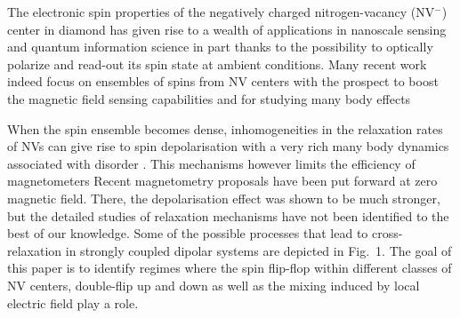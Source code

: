 \documentclass[preprintnumbers,amsmath,amssymb,superscriptaddress,twocolumn,showpacs]{revtex4-2}
\begin{document}
%

The electronic spin properties of the negatively charged nitrogen-vacancy (NV$^-$) center in diamond has given rise to a wealth of applications in nanoscale sensing and quantum information science in part thanks to the possibility to optically polarize and read-out its spin state at ambient conditions. Many recent work indeed focus on ensembles of spins from NV centers with the prospect to boost the magnetic field sensing capabilities and for studying many body effects
\citep{TALLAIRE2020421,edmonds2021characterisation, chatzidrosos2021fiberized, kucsko2018critical, giri_coupled_2018}

When the spin ensemble becomes dense, inhomogeneities in the relaxation rates of NVs can give rise to spin depolarisation with a very rich many body dynamics associated with disorder \citep{choi_observation_2017}. This mechanisms however limits the efficiency of magnetometers \citep{zhou2020quantum}
Recent magnetometry proposals have been put forward at zero magnetic field. There, the depolarisation effect was shown to be much stronger, but the detailed studies of relaxation mechanisms have not been identified to the best of our knowledge. Some of the possible processes that lead to cross-relaxation in strongly coupled dipolar systems are depicted in Fig.~1. The goal of this paper is to identify regimes where the spin flip-flop within different classes of NV centers, double-flip up and down as well as the mixing induced by local electric field play a role. 
\end{document}
